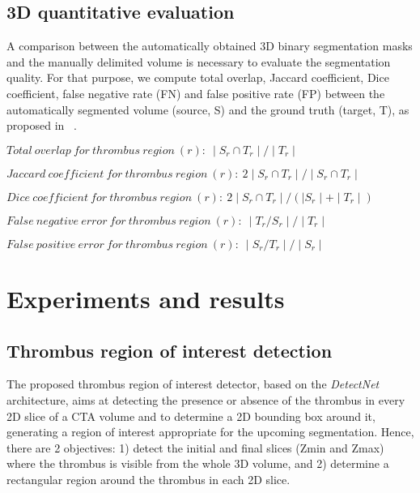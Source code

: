 \documentclass[preprint,authoryear,12pt]{elsarticle}
\begin{document}
\subsection{3D quantitative evaluation}
A comparison between the automatically obtained 3D binary segmentation masks and the manually delimited volume is necessary to evaluate the segmentation quality. For that purpose, we compute total overlap, Jaccard coefficient, Dice coefficient, false negative rate (FN) and false positive rate (FP) between the automatically segmented volume (source, S) and the ground truth (target, T), as proposed in ~\citep{itk}. \newline \par
\(Total\ overlap\ for\ thrombus\ region\ (r):\ \mid S_{r} \cap T_{r} \mid / \mid T_{r} \mid\) \par
\(Jaccard\ coefficient\ for\ thrombus\ region\ (r):\ 2 \mid S_{r} \cap T_{r} \mid / \mid S_{r} \cap T_{r} \mid\) \par
\(Dice\ coefficient\ for\ thrombus\ region\ (r):\ 2 \mid S_{r} \cap T_{r} \mid / (\mid S_{r} \mid + \mid T_{r} \mid) \) \par
\(False\ negative\ error\ for\  thrombus\ region\ (r):\ \mid T_{r}/S_{r} \mid / \mid T_{r} \mid\)\par
\(False\ positive\ error\ for\ thrombus\ region\ (r):\ \mid S_{r}/T_{r} \mid / \mid S_{r} \mid\)


\section{Experiments and results}
\label{sec:results}

\subsection{Thrombus region of interest detection}

The proposed thrombus region of interest detector, based on the \textit{DetectNet} architecture, aims at detecting the presence or absence of the thrombus in every 2D slice of a CTA volume and to determine a 2D bounding box around it, generating a region of interest appropriate for the upcoming segmentation. Hence, there are 2 objectives: 1) detect the initial and final slices (Zmin and Zmax) where the thrombus is visible from the whole 3D volume, and 2) determine a rectangular region around the thrombus in each 2D slice. \par
\end{document}
